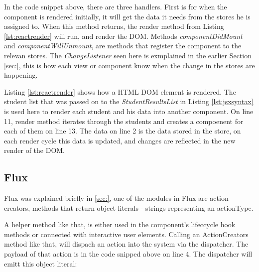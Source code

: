 

In the code snippet above, there are three handlers. First is for when the component is rendered initially, it will get the data it needs from the stores he is assigned to. When this method returns, the render method from Listing \ref{lst:reactrender} will run, and render the DOM. Methods \emph{componentDidMount} and \emph{componentWillUnmount}, are methods that register the component to the relevan stores. The \emph{ChangeListener} seen here is exmplained in the earlier Section \ref{sec:}, this is how each view or component know when the change in the stores are happening.



Listing \ref{lst:reactrender} shows how a HTML DOM element is rendered. The student list that was passed on to the \emph{StudentResultsList} in Listing \ref{lst:jsxsyntax} is used here to render each student and his data into another component. On line 11, render method iterates through the students and creates a compoenent for each of them on line 13. The data on line 2 is the data stored in the store, on each render cycle this data is updated, and changes are reflected in the new render of the DOM.

\subsection{Flux}
Flux was explained briefly in \ref{sec:}, one of the modules in Flux are action creators, methods that return object literals - strings representing an actionType.



A helper method like that, is either used in the component's lifeccycle hook methods or connected with interactive user elements. Calling an ActionCreators method like that, will dispach an action into the system via the dispatcher. The payload of that action is in the code snipped above on line 4. The dispatcher will emitt this object literal:



